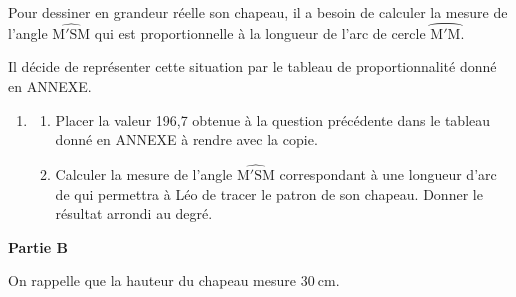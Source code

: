 \documentclass[11pt]{article}
\begin{document}
Pour dessiner en grandeur réelle son chapeau, il a besoin de calculer la mesure de l'angle $\widehat{\mathrm{M}'\mathrm{SM}}$ qui est proportionnelle à la longueur de l'arc de cercle $\wideparen{\mathrm{M}'\mathrm{M}}$.

\smallskip

Il décide de représenter cette situation par le tableau de proportionnalité donné en ANNEXE.

\smallskip

\begin{enumerate}
	\item[~]\begin{enumerate}[start=2]
		\item Placer la valeur 196,7 obtenue à la question précédente dans le tableau donné en ANNEXE à rendre avec la copie.
		\item Calculer la mesure de l'angle $\widehat{\mathrm{M}'\mathrm{SM}}$ correspondant à une longueur d'arc de  qui permettra à Léo de tracer le patron de son chapeau. Donner le résultat arrondi au degré.
	\end{enumerate}
\end{enumerate}

\bigskip

\textbf{Partie B}

\medskip

On rappelle que la hauteur du chapeau mesure $30 \mathrm{~cm}$.
\end{document}
